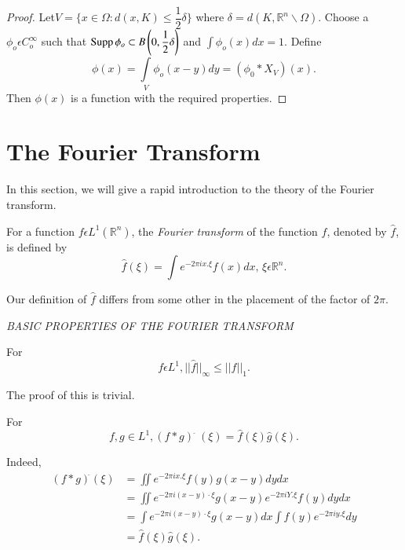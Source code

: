 \begin{proof}
  Let\pageoriginale $V = \{ x \in  \Omega: d (x, K) \leq \dfrac{1}{2} \delta \}$ where
  $\delta = d(K, \mathbb{R}^n \backslash \Omega )$. Choose a $\phi _o \epsilon
  C^\infty_o$ such that $\operatorname{Supp} \phi_o \subset B \left(0, \dfrac{1}{2}
  \delta\right)$ and $\int \phi_o (x)dx=1$. Define 
  $$
  \phi (x) = \int\limits_V \phi_o (x - y) dy = (\phi_0 * X_V) (x). 
  $$
  Then $\phi (x)$ is a function with the required properties.
\end{proof}

\section{The Fourier Transform}\label{chap1:sec2} %

In this section, we will give a rapid introduction to the theory of
the Fourier transform. 

For a function $f \epsilon L^1(\mathbb{R}^n)$, the \textit {Fourier
  transform} of the function $f$, denoted by $\hat{f}$, is defined by  
$$
\hat{f}(\xi) = \int e^{-2 \pi i x. \xi}f (x) dx, \,\xi \epsilon \mathbb{R}^n.
$$
\setcounter{rem}{8}
\begin{rem}\label{chap1:sec2:rem1.9}
  Our definition of $\hat{f}$ differs from some other in the placement of
  the factor of $2 \pi$. 
\end{rem}

\noindent\textit{BASIC PROPERTIES OF THE FOURIER TRANSFORM}

For
\begin{equation*}
f \epsilon  L^1, || \hat{f} ||_\infty \leq || f
||_1.\tag{1.10}\label{chap1:sec2:eq1.10}  
\end{equation*}

The proof of this is trivial.

For
\begin{equation*}
  f,g \in L^1, (f*g)^{~\hat{}}~ (\xi)= \hat{f}(\xi)
  \hat{g}(\xi).\tag{1.11}\label{chap1:sec2:eq1.11} 
\end{equation*}

Indeed,
\begin{align*}
  (f *g)^ {\hat{}}(\xi) &= \iint e^{-2 \pi i x. \xi}f(y) g(x-y)dy dx\\
  &=\iint e^{-2 \pi i (x-y)\cdot \xi}g(x-y)e^{-2 \pi i Y. \xi} f(y)dy dx\\
  &= \int e^{-2 \pi i (x-y)\cdot \xi}g (x-y)dx \int f(y)e^{-2 \pi i y. \xi}dy\\
  &=\hat{f}(\xi)\hat{g} (\xi ).
\end{align*}

